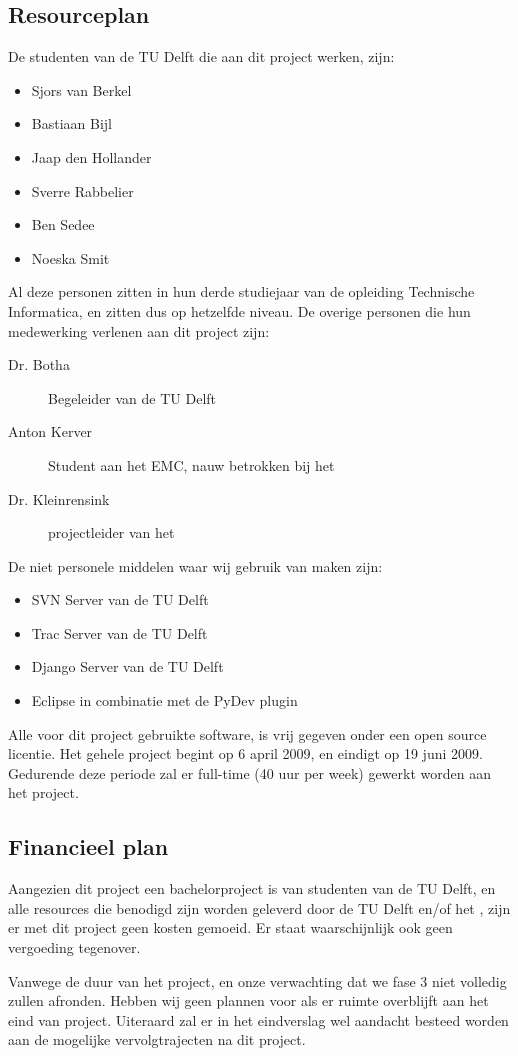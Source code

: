 \subsection{Resourceplan}
De studenten van de TU Delft die aan dit project werken, zijn:
\begin{itemize}
	\item Sjors van Berkel
	\item Bastiaan Bijl
	\item Jaap den Hollander
	\item Sverre Rabbelier
	\item Ben Sedee
	\item Noeska Smit
\end{itemize}
Al deze personen zitten in hun derde studiejaar van de opleiding Technische Informatica, en zitten dus op hetzelfde niveau. 
De overige personen die hun medewerking verlenen aan dit project zijn:
\begin{description}
	\item[Dr. Botha] Begeleider van de TU Delft
	\item[Anton Kerver] Student aan het EMC, nauw betrokken bij het \casamproject
	\item[Dr. Kleinrensink] projectleider van het \casamproject
\end{description}
De niet personele middelen waar wij gebruik van maken zijn:
\begin{itemize}
	\item SVN Server van de TU Delft
	\item Trac Server van de TU Delft
	\item Django Server van de TU Delft
	\item Eclipse in combinatie met de PyDev plugin
\end{itemize}
Alle voor dit project gebruikte software, is vrij gegeven onder een open source licentie.
Het gehele project begint op 6 april 2009, en eindigt op 19 juni 2009. 
Gedurende deze periode zal er full-time (40 uur per week) gewerkt worden aan het project.


\subsection{Financieel plan}
Aangezien dit project een bachelorproject is van studenten van de TU Delft, en alle resources die benodigd zijn worden geleverd door de TU Delft en/of het \casamproject, zijn er met dit project geen kosten gemoeid. Er staat waarschijnlijk ook geen vergoeding tegenover.


Vanwege de duur van het project, en onze verwachting dat we fase 3 niet volledig zullen afronden. Hebben wij geen plannen voor als er ruimte overblijft aan het eind van project. Uiteraard zal er in het eindverslag wel aandacht besteed worden aan de mogelijke vervolgtrajecten na dit project.
